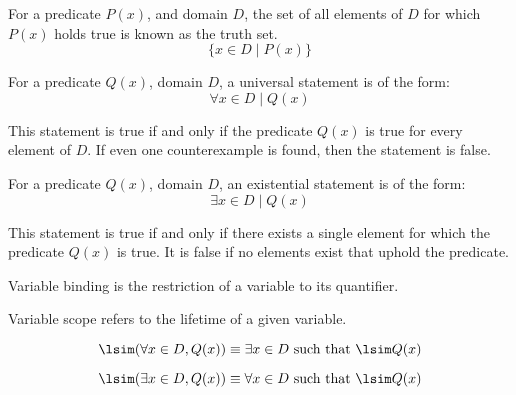 \documentclass[11pt]{article}
\begin{document}
\begin{definition}\label{def:truth-set}
    For a predicate $P(x)$, and domain $D$, the set of all elements of $D$ 
    for which $P(x)$ holds true is known as the truth set.
    \begin{equation*}
        \{ x \in D \mid P(x) \}
    \end{equation*}
\end{definition}

\begin{definition}\label{def:universal-quantified-stmts}
    For a predicate $Q(x)$, domain $D$, a universal statement is of the form:
    \begin{equation*}
        \forall x \in D \mid Q(x)
    \end{equation*}

    This statement is true if and only if the predicate $Q(x)$ is true for every element of $D$.
    If even one counterexample is found, then the statement is false.
\end{definition}

\begin{definition}\label{def:existential-quantified-stmts}
    For a predicate $Q(x)$, domain $D$, an existential statement is of the form:
    \begin{equation*}
        \exists x \in D \mid Q(x)
    \end{equation*}

    This statement is true if and only if there exists a single element for which the 
    predicate $Q(x)$ is true. It is false if no elements exist that uphold the predicate.
\end{definition}

Variable binding is the restriction of a variable to its quantifier.

Variable scope refers to the lifetime of a given variable.

\begin{definition}\label{def:neg-universal-stmts}
    \begin{equation*}
        \lsim (\forall x \in D, Q(x)) \equiv \exists x \in D \text{ such that } \lsim Q(x)
    \end{equation*}
\end{definition}

\begin{definition}\label{def:neg-existential-stmts}
    \begin{equation*}
        \lsim (\exists x \in D, Q(x)) \equiv \forall x \in D \text{ such that } \lsim Q(x)
    \end{equation*}
\end{definition}
\end{document}
